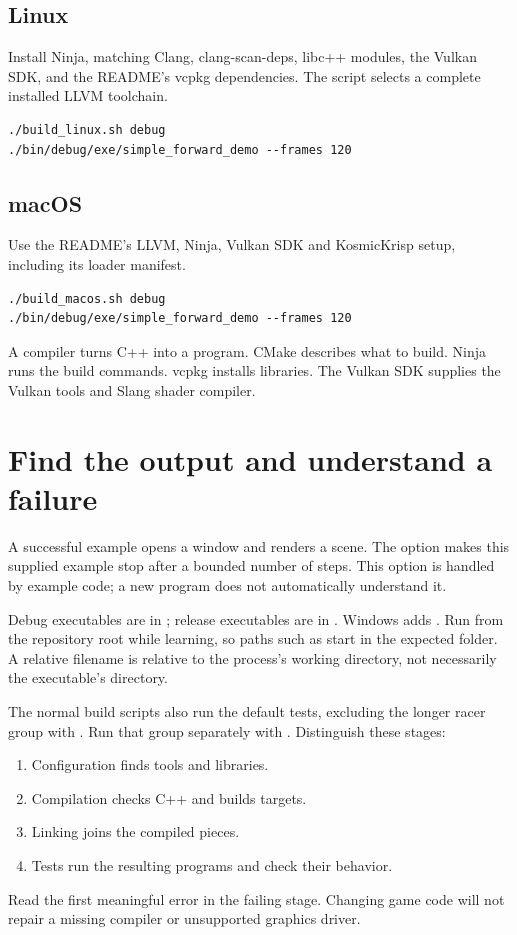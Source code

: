 \documentclass[11pt,a4paper]{article}
\begin{document}
\subsection*{Linux}
Install Ninja, matching Clang, clang-scan-deps, libc++ modules, the Vulkan SDK, and the README's vcpkg dependencies. The script selects a complete installed LLVM toolchain.
\begin{lstlisting}[language={}]
./build_linux.sh debug
./bin/debug/exe/simple_forward_demo --frames 120
\end{lstlisting}

\subsection*{macOS}
Use the README's LLVM, Ninja, Vulkan SDK and KosmicKrisp setup, including its loader manifest.
\begin{lstlisting}[language={}]
./build_macos.sh debug
./bin/debug/exe/simple_forward_demo --frames 120
\end{lstlisting}
\begin{remember}A compiler turns C++ into a program. CMake describes what to build. Ninja runs the build commands. vcpkg installs libraries. The Vulkan SDK supplies the Vulkan tools and Slang shader compiler.\end{remember}

\section{Find the output and understand a failure}
A successful example opens a window and renders a scene. The  option makes this supplied example stop after a bounded number of steps. This option is handled by example code; a new program does not automatically understand it.

Debug executables are in ; release executables are in . Windows adds . Run from the repository root while learning, so paths such as  start in the expected folder. A relative filename is relative to the process's working directory, not necessarily the executable's directory.

The normal build scripts also run the default tests, excluding the longer racer group with . Run that group separately with . Distinguish these stages:
\begin{enumerate}
\item Configuration finds tools and libraries.
\item Compilation checks C++ and builds targets.
\item Linking joins the compiled pieces.
\item Tests run the resulting programs and check their behavior.
\end{enumerate}
Read the first meaningful error in the failing stage. Changing game code will not repair a missing compiler or unsupported graphics driver.
\end{document}
